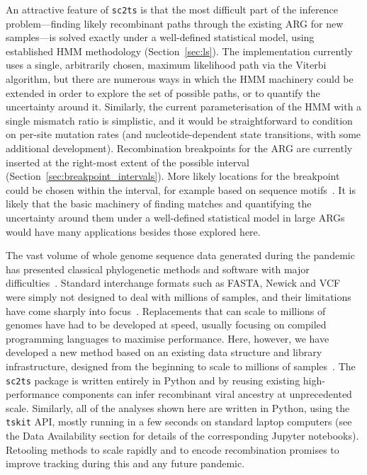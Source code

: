 \documentclass{article}
\begin{document}
An attractive feature of \texttt{sc2ts} is that the most difficult part of
the inference problem---finding likely recombinant paths through the existing ARG
for new samples---is solved exactly under a well-defined statistical model,
using established HMM methodology (Section~\ref{sec:ls}).
The implementation currently uses
a single, arbitrarily chosen, maximum likelihood path via the
Viterbi algorithm, but there are numerous ways in which the HMM machinery
could be extended in order to explore the set of possible paths, or to
quantify the uncertainty around it. Similarly, the current parameterisation
of the HMM with a single mismatch ratio is simplistic, and it would
be straightforward to condition on per-site mutation rates (and nucleotide-dependent
state transitions, with some additional development).
Recombination breakpoints for the ARG are currently inserted at the
right-most extent of the possible interval
(Section~\ref{sec:breakpoint_intervals}).
More likely locations for the
breakpoint could be chosen within the interval, for example based
on sequence motifs~\citep{Gallaher2020-mr, Yang2020-ct}.
It is likely that the basic machinery of finding matches and quantifying
the uncertainty around them under a well-defined statistical model
in large ARGs would have many applications besides those explored here.

The vast volume of whole genome sequence data generated during the pandemic
has presented classical phylogenetic methods and software with major
difficulties~\citep{Hodcroft2021-wt}.
Standard interchange formats such as FASTA, Newick and VCF were simply not designed
to deal with millions of samples, and their limitations have come sharply
into focus~\citep{Turakhia2021-ur,de2023maximum}.
Replacements that can scale to millions of genomes have had to be developed
at speed, usually focusing on compiled programming languages to maximise
performance. Here, however, we have developed a new method based on
an existing data structure and library infrastructure, designed
from the beginning to scale to millions of
samples~\citep{Kelleher2016-wk,Kelleher2019-ba}.
The \texttt{sc2ts} package is written entirely in Python
and by reusing existing high-performance components can infer
recombinant viral ancestry at unprecedented scale.
Similarly, all of the analyses shown here are written in Python,
using the \texttt{tskit} API, mostly running in a few seconds
on standard laptop computers (see the Data Availability
section for details of the corresponding Jupyter notebooks).
Retooling methods to scale rapidly and to encode recombination
promises to improve tracking during this and any future pandemic.
\end{document}
